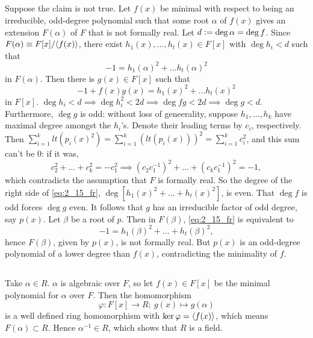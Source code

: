 \documentclass[12pt]{article}
\begin{document}
\subsection{} 
Suppose the claim is not true. 
Let $f(x)$ be minimal with respect to being an irreducible, odd-degree polynomial such that some root $\alpha$ of $f(x)$ gives an extension $F(\alpha)$ of $F$ that is not formally real. 
Let $d \vcentcolon= \deg \alpha = \deg f$. 
Since $F(\alpha) \equiv F[x] / \<f(x)\>$, there exist $h_{1}(x), \ldots, h_{t}(x) \in F[x]$ with $\deg{h_i} < d$ such that 
$$-1 = h_{1}(\alpha)^2 + \ldots h_{t}(\alpha)^2$$
in $F(\alpha)$. 
Then there is $g(x) \in F[x]$ such that 
\begin{equation} \label{eq:2_15_fr} 
  -1 + f(x) g(x) = h_{1}(x)^2 + \ldots h_{t}(x)^2
\end{equation}
in $F[x]$. 
$\deg{h_i} < d \implies \deg{h_{i}^2} < 2d \implies \deg{fg} < 2d \implies \deg{g} < d$. 
Furthermore, $\deg g$ is odd: 
without loss of geneerality, suppose $h_{1}, \ldots, h_{k}$ have maximal degree amongst the $h_i$'s. 
Denote their leading terms by $c_i$, respectively. 
Then $\sum_{i = 1}^{k} lt(p_{i}(x)^2) = \sum_{i = 1}^{k} (lt(p_{i}(x)))^2 = \sum_{i = 1}^{k} c_{i}^{2}$, and this sum can't be 0: 
if it was, 
$$c_{2}^{2} + \ldots + c_{k}^{2} = -c_{1}^{2} \implies (c_{2} c_{1}^{-1})^2 + \ldots + (c_{k} c_{1}^{-1})^2 = -1,$$
which contradicts the assumption that $F$ is formally real. 
So the degree of the right side of \eqref{eq:2_15_fr}, $\deg[h_{1}(x)^2 + \ldots + h_{t}(x)^2]$, is even. 
That $\deg{f}$ is odd forces $\deg{g}$ even. 
It follows that $g$ has an irreducible factor of odd degree, say $p(x)$.  
Let $\beta$ be a root of $p$. 
Then in $F(\beta)$, \eqref{eq:2_15_fr} is equivalent to 
$$-1 = h_1(\beta)^2 + \ldots + h_t(\beta)^2,$$ 
hence $F(\beta)$, given by $p(x)$, is not formally real. 
But $p(x)$ is an odd-degree polynomial of a lower degree than $f(x)$, contradicting the minimality of $f$. 

\subsection{} 
Take $\alpha \in R$. 
$\alpha$ is algebraic over $F$, so let $f(x) \in F[x]$ be the minimal polynomial for $\alpha$ over $F$. 
Then the homomorphism 
$$\varphi:F[x] \rightarrow R; \: g(x) \mapsto g(\alpha)$$ 
is a well defined ring homomorphism with $\ker \varphi = \langle f(x)\rangle$, which means $F(\alpha) \subset R$. 
Hence $\alpha^{-1} \in R$, which shows that $R$ is a field.  
\end{document}
